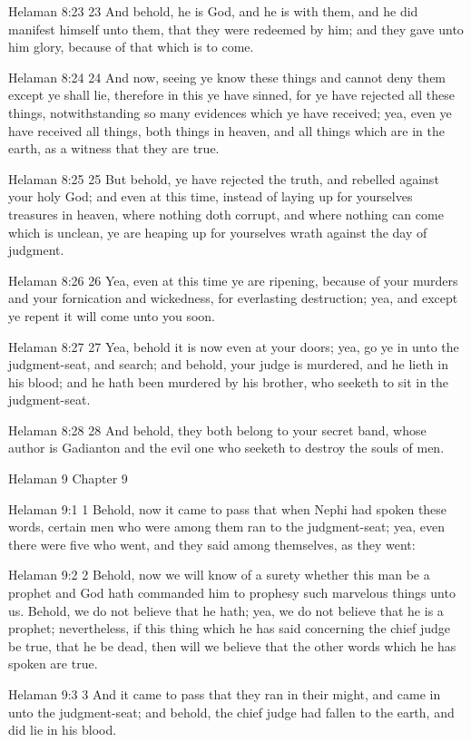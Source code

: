 Helaman 8:23
 23 And behold, he is God, and he is with them, and he did
manifest himself unto them, that they were redeemed by him; and
they gave unto him glory, because of that which is to come.

Helaman 8:24
 24 And now, seeing ye know these things and cannot deny them
except ye shall lie, therefore in this ye have sinned, for ye
have rejected all these things, notwithstanding so many evidences
which ye have received; yea, even ye have received all things,
both things in heaven, and all things which are in the earth, as
a witness that they are true.

Helaman 8:25
 25 But behold, ye have rejected the truth, and rebelled against
your holy God; and even at this time, instead of laying up for
yourselves treasures in heaven, where nothing doth corrupt, and
where nothing can come which is unclean, ye are heaping up for
yourselves wrath against the day of judgment.

Helaman 8:26
 26 Yea, even at this time ye are ripening, because of your
murders and your fornication and wickedness, for everlasting
destruction; yea, and except ye repent it will come unto you
soon.

Helaman 8:27
 27 Yea, behold it is now even at your doors; yea, go ye in unto
the judgment-seat, and search; and behold, your judge is
murdered, and he lieth in his blood; and he hath been murdered by
his brother, who seeketh to sit in the judgment-seat.

Helaman 8:28
 28 And behold, they both belong to your secret band, whose
author is Gadianton and the evil one who seeketh to destroy the
souls of men.

Helaman 9
Chapter 9

Helaman 9:1
 1 Behold, now it came to pass that when Nephi had spoken these
words, certain men who were among them ran to the judgment-seat;
yea, even there were five who went, and they said among
themselves, as they went:

Helaman 9:2
 2 Behold, now we will know of a surety whether this man be a
prophet and God hath commanded him to prophesy such marvelous
things unto us. Behold, we do not believe that he hath; yea, we
do not believe that he is a prophet; nevertheless, if this thing
which he has said concerning the chief judge be true, that he be
dead, then will we believe that the other words which he has
spoken are true.

Helaman 9:3
 3 And it came to pass that they ran in their might, and came in
unto the judgment-seat; and behold, the chief judge had fallen to
the earth, and did lie in his blood.


